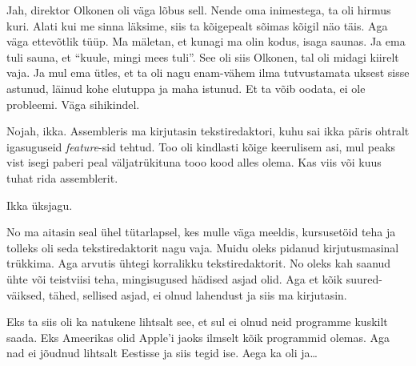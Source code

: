 
Jah, direktor Olkonen oli väga lõbus sell. Nende oma inimestega, ta oli hirmus 
kuri. Alati kui me sinna läksime, siis ta kõigepealt sõimas kõigil näo täis. 
Aga väga ettevõtlik tüüp. Ma mäletan, et kunagi ma olin kodus, isaga saunas. Ja 
ema tuli sauna, et \enquote{kuule, mingi mees tuli}. See oli siis Olkonen, tal 
oli midagi kiirelt vaja. Ja mul ema ütles, et ta oli nagu enam-vähem ilma 
tutvustamata uksest sisse astunud, läinud kohe elutuppa ja maha istunud. Et ta 
võib oodata, ei ole  probleemi. Väga sihikindel. 


Nojah, ikka. Assembleris ma kirjutasin tekstiredaktori, kuhu sai ikka päris 
ohtralt igasuguseid \emph{feature}-sid tehtud. Too oli kindlasti kõige 
keerulisem asi, mul peaks vist isegi  paberi peal väljatrükituna tooo kood 
alles olema. Kas viis  või kuus tuhat rida assemblerit. 


Ikka üksjagu. 


No ma aitasin seal ühel tütarlapsel, kes mulle väga meeldis,  kursusetöid teha 
ja tolleks oli seda tekstiredaktorit nagu vaja. Muidu oleks pidanud 
kirjutusmasinal trükkima. Aga arvutis ühtegi korralikku tekstiredaktorit. No 
oleks kah saanud ühte või teistviisi teha,  mingisugused hädised asjad olid. 
Aga et kõik suured-väiksed, tähed, sellised asjad, ei olnud lahendust ja siis 
ma kirjutasin.


Eks ta siis oli ka natukene lihtsalt see, et sul ei olnud neid programme 
kuskilt saada. Eks Ameerikas olid Apple'i jaoks ilmselt kõik programmid olemas. 
Aga nad ei jõudnud lihtsalt Eestisse ja siis tegid ise. Aega ka oli ja\ldots


